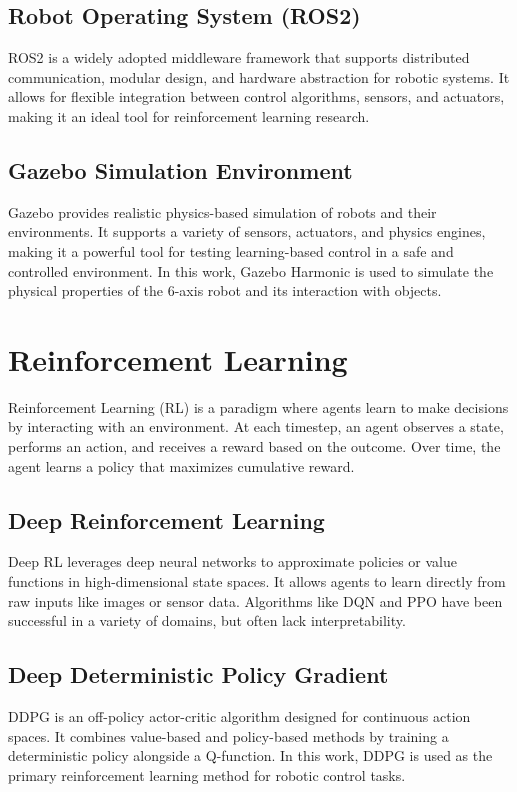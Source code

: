\subsection{Robot Operating System (ROS2)} \label{ss:ros2}
ROS2 is a widely adopted middleware framework that supports distributed communication, modular design, and hardware abstraction for robotic systems. It allows for flexible integration between control algorithms, sensors, and actuators, making it an ideal tool for reinforcement learning research.

\subsection{Gazebo Simulation Environment} \label{ss:simulation}
Gazebo provides realistic physics-based simulation of robots and their environments. It supports a variety of sensors, actuators, and physics engines, making it a powerful tool for testing learning-based control in a safe and controlled environment. In this work, Gazebo Harmonic is used to simulate the physical properties of the 6-axis robot and its interaction with objects.

\section{Reinforcement Learning} \label{se:reinforcement_learning}
Reinforcement Learning (RL) is a paradigm where agents learn to make decisions by interacting with an environment. At each timestep, an agent observes a state, performs an action, and receives a reward based on the outcome. Over time, the agent learns a policy that maximizes cumulative reward.

\subsection{Deep Reinforcement Learning} \label{ss:deep_reinforcement_learning}
Deep RL leverages deep neural networks to approximate policies or value functions in high-dimensional state spaces. It allows agents to learn directly from raw inputs like images or sensor data. Algorithms like DQN and PPO have been successful in a variety of domains, but often lack interpretability.

\subsection{Deep Deterministic Policy Gradient} \label{ss:deep_deterministic_policy_gradient}
DDPG is an off-policy actor-critic algorithm designed for continuous action spaces. It combines value-based and policy-based methods by training a deterministic policy alongside a Q-function. In this work, DDPG is used as the primary reinforcement learning method for robotic control tasks.

